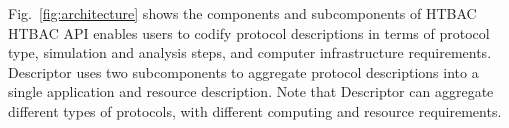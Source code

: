 








Fig.~\ref{fig:architecture} shows the components and subcomponents of HTBAC
HTBAC API enables users to codify protocol descriptions in terms of protocol
type, simulation and analysis steps, and computer infrastructure
requirements. Descriptor uses two subcomponents to aggregate protocol
descriptions into a single application and resource description. Note that
Descriptor can aggregate different types of protocols, with different
computing and resource requirements.

